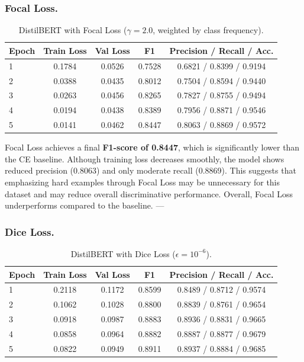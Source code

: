 \subsubsection{Focal Loss.}

\begin{table}[H]
\centering
\caption{DistilBERT with Focal Loss ($\gamma = 2.0$, weighted by class frequency).}
\begin{tabular}{lcccc}
\hline
\textbf{Epoch} & \textbf{Train Loss} & \textbf{Val Loss} & \textbf{F1} & \textbf{Precision} / \textbf{Recall} / \textbf{Acc.} \\
\hline
1 & 0.1784 & 0.0526 & 0.7528 & 0.6821 / 0.8399 / 0.9194 \\
2 & 0.0388 & 0.0435 & 0.8012 & 0.7504 / 0.8594 / 0.9440 \\
3 & 0.0263 & 0.0456 & 0.8265 & 0.7827 / 0.8755 / 0.9494 \\
4 & 0.0194 & 0.0438 & 0.8389 & 0.7956 / 0.8871 / 0.9546 \\
5 & 0.0141 & 0.0462 & 0.8447 & 0.8063 / 0.8869 / 0.9572 \\
\hline
\end{tabular}
\label{tab:distilbert_focal}
\end{table}

Focal Loss achieves a final \textbf{F1-score of 0.8447}, which is significantly lower than the CE baseline. 
Although training loss decreases smoothly, the model shows reduced precision (0.8063) and only moderate recall (0.8869). 
This suggests that emphasizing hard examples through Focal Loss may be unnecessary for this dataset and may reduce overall discriminative performance. 
Overall, Focal Loss underperforms compared to the baseline.
---

\subsubsection{Dice Loss.}

\begin{table}[H]
\centering
\caption{DistilBERT with Dice Loss ($\epsilon = 10^{-6}$).}
\begin{tabular}{lcccc}
\hline
\textbf{Epoch} & \textbf{Train Loss} & \textbf{Val Loss} & \textbf{F1} & \textbf{Precision} / \textbf{Recall} / \textbf{Acc.} \\
\hline
1 & 0.2118 & 0.1172 & 0.8599 & 0.8489 / 0.8712 / 0.9574 \\
2 & 0.1062 & 0.1028 & 0.8800 & 0.8839 / 0.8761 / 0.9654 \\
3 & 0.0918 & 0.0987 & 0.8883 & 0.8936 / 0.8831 / 0.9665 \\
4 & 0.0858 & 0.0964 & 0.8882 & 0.8887 / 0.8877 / 0.9679 \\
5 & 0.0822 & 0.0949 & 0.8911 & 0.8937 / 0.8884 / 0.9685 \\
\hline
\end{tabular}
\label{tab:distilbert_dice}
\end{table}


